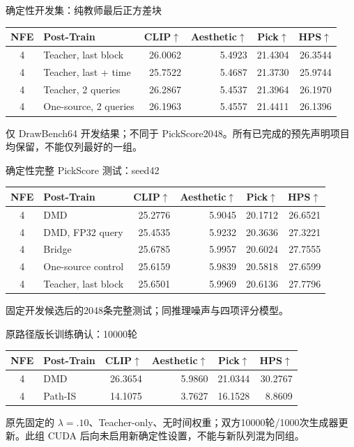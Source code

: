 \documentclass[10pt,aspectratio=169]{beamer}
\begin{document}
\begin{frame}{确定性开发集：纯教师最后正方差块}
\scriptsize\centering
\begin{tabular}{clrrrr}\toprule
NFE & Post-Train & CLIP$\uparrow$ & Aesthetic$\uparrow$ & Pick$\uparrow$ & HPS$\uparrow$\\\midrule
4 & Teacher, last block & 26.0062 & 5.4923 & 21.4304 & 26.3544 \\
4 & Teacher, last + time & 25.7522 & 5.4687 & 21.3730 & 25.9744 \\
4 & Teacher, 2 queries & 26.2867 & 5.4537 & 21.3964 & 26.1970 \\
4 & One-source, 2 queries & 26.1963 & 5.4557 & 21.4411 & 26.1396 \\
\bottomrule\end{tabular}\par\raggedright\vspace{6pt}
仅 DrawBench64 开发结果；不同于 PickScore2048。所有已完成的预先声明项目均保留，不能仅列最好的一组。
\end{frame}
\begin{frame}{确定性完整 PickScore 测试：seed42}
\scriptsize\centering
\begin{tabular}{clrrrr}\toprule
NFE & Post-Train & CLIP$\uparrow$ & Aesthetic$\uparrow$ & Pick$\uparrow$ & HPS$\uparrow$\\\midrule
4 & DMD & 25.2776 & 5.9045 & 20.1712 & 26.6521 \\
4 & DMD, FP32 query & 25.4535 & 5.9232 & 20.3636 & 27.3221 \\
4 & Bridge & 25.6785 & 5.9957 & 20.6024 & 27.7555 \\
4 & One-source control & 25.6159 & 5.9839 & 20.5818 & 27.6599 \\
4 & Teacher, last block & 25.6501 & 5.9969 & 20.6136 & 27.7796 \\
\bottomrule\end{tabular}\par\raggedright\vspace{6pt}
固定开发候选后的2048条完整测试；同推理噪声与四项评分模型。
\end{frame}
\begin{frame}{原路径版长训练确认：10000轮}
\scriptsize\centering
\begin{tabular}{clrrrr}\toprule
NFE & Post-Train & CLIP$\uparrow$ & Aesthetic$\uparrow$ & Pick$\uparrow$ & HPS$\uparrow$\\\midrule
4 & DMD & 26.3654 & 5.9860 & 21.0344 & 30.2767 \\
4 & Path-IS & 14.1075 & 3.7627 & 16.1528 & 8.8609 \\
\bottomrule\end{tabular}\par\raggedright\vspace{6pt}
原先固定的 $\lambda=.10$、Teacher-only、无时间权重；双方10000轮/1000次生成器更新。此组 CUDA 后向未启用新确定性设置，不能与新队列混为同组。
\end{frame}
\end{document}
